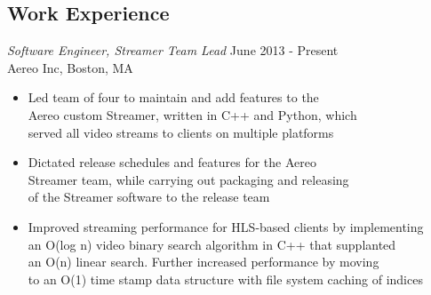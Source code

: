 \documentclass[line,margin]{res}
\begin{document}
\address{197 Summer St, Apt 2, Somerville MA, 02143}
\address{(563) 581-8229\\ \href{mailto:eric.d.brown23@gmail.com}{eric.d.brown23@gmail.com}}

    \begin{resume}
        \section{Work Experience}
            {\sl Software Engineer, Streamer Team Lead} \hfill June 2013 - Present \\ %
            Aereo Inc, Boston, MA
                \begin{itemize} \itemsep -2pt %
                    \item Led team of four to maintain and add features to the \\
                          Aereo custom Streamer, written in C++ and Python, which \\
                          served all video streams to clients on multiple platforms
                    \item Dictated release schedules and features for the Aereo \\
                          Streamer team, while carrying out packaging and releasing \\
                          of the Streamer software to the release team
                    \item Improved streaming performance for HLS-based clients by implementing \\
                          an O(log n) video binary search algorithm in C++ that supplanted \\
                          an O(n) linear search. Further increased performance by moving \\
                          to an O(1) time stamp data structure with file system caching of indices
                \end{itemize}


\end{resume}
\end{document}

